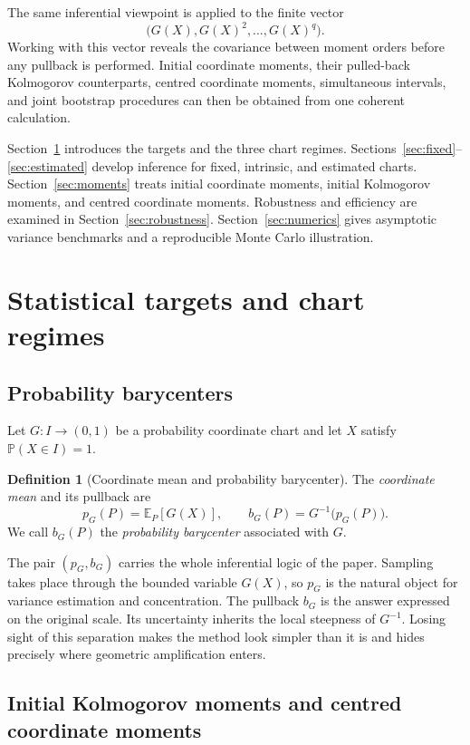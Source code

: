 \documentclass[11pt,a4paper]{article}
\theoremstyle{definition}
\newtheorem{definition}[theorem]{Definition}
\newcommand{\E}{\mathbb{E}}
\newcommand{\Prob}{\mathbb{P}}
\begin{document}
The same inferential viewpoint is applied to the finite vector
\[
\bigl(G(X),G(X)^2,\ldots,G(X)^q\bigr).
\]
Working with this vector reveals the covariance between moment orders before any pullback is performed. Initial coordinate moments, their pulled-back Kolmogorov counterparts, centred coordinate moments, simultaneous intervals, and joint bootstrap procedures can then be obtained from one coherent calculation.

Section~\ref{sec:targets} introduces the targets and the three chart regimes. Sections~\ref{sec:fixed}--\ref{sec:estimated} develop inference for fixed, intrinsic, and estimated charts. Section~\ref{sec:moments} treats initial coordinate moments, initial Kolmogorov moments, and centred coordinate moments. Robustness and efficiency are examined in Section~\ref{sec:robustness}. Section~\ref{sec:numerics} gives asymptotic variance benchmarks and a reproducible Monte Carlo illustration.

\section{Statistical targets and chart regimes}\label{sec:targets}

\subsection{Probability barycenters}

Let $G:I\to(0,1)$ be a probability coordinate chart and let $X$ satisfy $\Prob(X\in I)=1$.

\begin{definition}[Coordinate mean and probability barycenter]
The \emph{coordinate mean} and its pullback are
\[
p_G(P)=\E_P[G(X)],
\qquad
b_G(P)=G^{-1}\!\bigl(p_G(P)\bigr).
\]
We call $b_G(P)$ the \emph{probability barycenter} associated with $G$.
\end{definition}

The pair $(p_G,b_G)$ carries the whole inferential logic of the paper. Sampling takes place through the bounded variable $G(X)$, so $p_G$ is the natural object for variance estimation and concentration. The pullback $b_G$ is the answer expressed on the original scale. Its uncertainty inherits the local steepness of $G^{-1}$. Losing sight of this separation makes the method look simpler than it is and hides precisely where geometric amplification enters.

\subsection{Initial Kolmogorov moments and centred coordinate moments}
\end{document}
